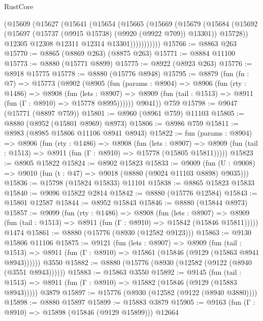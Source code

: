 \begin{lexlean}{RustCore}
\begin{coremodule}
            (@15609
              (@15627
                (@15641
                  (@15654
                    (@15665
                      (@15669
                        (@15679
                          (@15684
                            (@15692
                              (@15697 (@15737 (@9915 @15738) (@9920 (@9922 @709)) @13301))
                              @15728))
                          @12305
                          @12308
                          @12311
                          @12314
                          @13301)))))))))))
@15766 := @8863 @263
@15770 := @8865 (@8869 @263) (@8875 @263)
@15771 := @8884 @11100
@15773 := @8880 (@15771 @8899)
@15775 := @8922 (@8923 @263)
@15776 := @8918 @15775
@15778 := @8880 (@15776 @8948)
@15795 := @8879
    (fun (fn : @7) =>
    @15773
      (@8902
        (@8905
          (fun (params : @8904) =>
          @8906
            (fun (rty : @1486) =>
            @8908
              (fun (lets : @8907) =>
              @8909 (fun (tail : @1513) => @8911 (fun (Γ : @8910) => @15778 @8995))))))
        @9041))
    @759
@15798 := @9047 (@15771 (@8897 @759))
@15801 := @8960 (@8961 @759) @11103
@15805 := @8880 (@8952 (@15801 @8969) @8973)
@15806 := @8986 @759
@15811 := @8983 (@8985 @15806 @11106 @8941 @8943)
@15822 := fun (params : @8904) =>
  @8906
    (fun (rty : @1486) =>
    @8908
      (fun (lets : @8907) =>
      @8909 (fun (tail : @1513) => @8911 (fun (Γ : @8910) => @15778 (@15805 @15811)))))
@15823 := @8905 @15822
@15824 := @8902 @15823
@15833 := @9009
    (fun (U : @9008) => @9010 (fun (t : @47) => @9018 (@8880 (@9024 @11103 @8898) @9035)))
@15836 := @15798 (@15824 @15833) @11101
@15838 := @8865 @15823 @15833
@15840 := @9096 @15822 @2814
@15842 := @8880 (@15776 @12584)
@15843 := @15801 @12587
@15844 := @8952 @15843
@15846 := @8880 (@15844 @8973)
@15857 := @9099
    (fun (rty : @1486) =>
    @8908
      (fun (lets : @8907) =>
      @8909 (fun (tail : @1513) => @8911 (fun (Γ : @8910) => @15842 (@15846 @15811)))))
    @1474
@15861 := @8880 (@15776 (@8930 (@12582 @9123)))
@15863 := @9130 @15806 @11106
@15875 := @9121
    (fun (lets : @8907) =>
    @8909
      (fun (tail : @1513) =>
      @8911 (fun (Γ : @8910) => @15861 (@15846 (@9129 (@15863 @8941 @8943))))))
    @3550
@15882 := @8880 (@15776 (@8930 (@12582 (@9122 (@8940 (@3551 @8943))))))
@15883 := @15863 @3550
@15892 := @9145
    (fun (tail : @1513) => @8911 (fun (Γ : @8910) => @15882 (@15846 (@9129 (@15883 @8943)))))
    @3879
@15897 := @15776 (@8930 (@12582 (@9122 (@8940 @3880))))
@15898 := @8880 @15897
@15899 := @15883 @3879
@15905 := @9163 (fun (Γ : @8910) => @15898 (@15846 (@9129 @15899))) @12664

\end{coremodule}
\end{lexlean}
